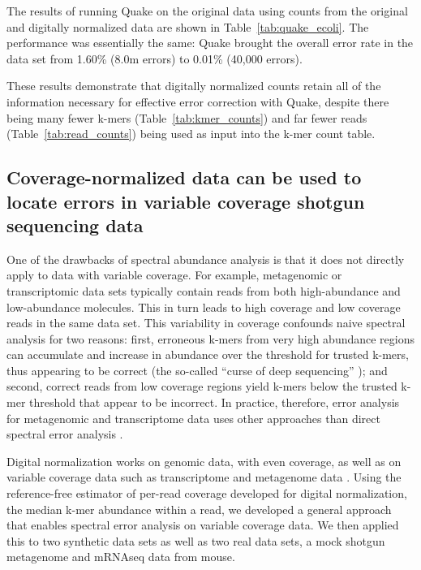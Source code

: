 \documentclass{article}
\begin{document}
The results of running Quake on the original data using counts from
the original and digitally normalized data are shown in
Table~\ref{tab:quake_ecoli}.  The performance was essentially the
same: Quake brought the overall error rate in the data set from 1.60\%
(8.0m errors) to 0.01\% (40,000 errors).

These results demonstrate that digitally normalized counts retain all
of the information necessary for effective error correction with
Quake, despite there being many fewer k-mers
(Table~\ref{tab:kmer_counts}) and far fewer reads
(Table~\ref{tab:read_counts}) being used as input into the k-mer count
table.

\subsection{Coverage-normalized data can be used to locate errors in variable
coverage shotgun sequencing data}

One of the drawbacks of spectral
abundance analysis is that it does not directly apply to data with
variable coverage.  For example, metagenomic or transcriptomic data
sets typically contain reads from both high-abundance and
low-abundance molecules.  This in turn leads to high coverage and low
coverage reads in the same data set. This variability in coverage
confounds naive spectral analysis for two reasons: first, erroneous
k-mers from very high abundance regions can accumulate and increase in
abundance over the threshold for trusted k-mers, thus appearing to be
correct (the so-called ``curse of deep sequencing'' \cite{Roberts2011}); and second, correct reads from low coverage regions yield
k-mers below the trusted k-mer threshold that appear to be incorrect.
In practice, therefore, error analysis for metagenomic and
transcriptome data uses other approaches than direct spectral error
analysis \cite{Medvedev2011, seecer, freclu}.

Digital normalization works on genomic data, with even coverage, as
well as on variable coverage data such as transcriptome and metagenome
data \cite{Brown2012, Lowe2015, Howe2014}.  Using the reference-free estimator
of per-read coverage developed for digital normalization, the median
k-mer abundance within a read, we developed a general approach that
enables spectral error analysis on variable coverage data.  We then
applied this to two synthetic data sets as well as two real data sets,
a mock shotgun metagenome and mRNAseq data from mouse.
\end{document}
